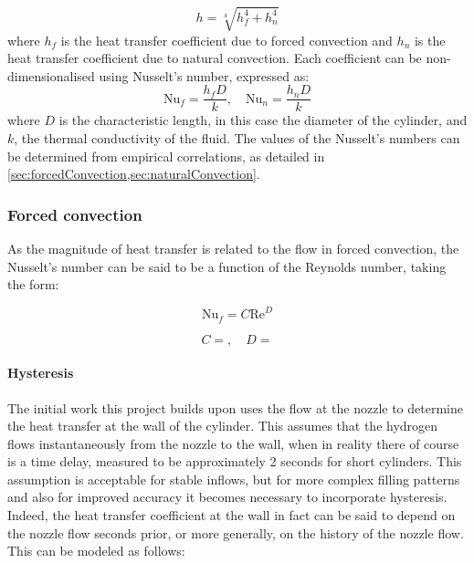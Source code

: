 \begin{equation}
h = \sqrt[4]{h_f^4 + h_n^4} 
\end{equation}
where $h_f$ is the heat transfer coefficient due to forced convection and $h_n$ is the heat transfer coefficient due to natural convection. Each coefficient can be non-dimensionalised using Nusselt's number, expressed as:
\begin{equation}
\text{Nu}_f = \frac{h_f D}{k}, \quad \text{Nu}_n = \frac{h_n D}{k}
\end{equation}
where $D$ is the characteristic length, in this case the diameter of the cylinder, and $k$, the thermal conductivity of the fluid. The values of the Nusselt's numbers can be determined from empirical correlations, as detailed in \cref{sec:forcedConvection,sec:naturalConvection}.

\subsubsection{Forced convection}
\label{sec:forcedConvection}
As the magnitude of heat transfer is related to the flow in forced convection, the Nusselt's number can be said to be a function of the Reynolds number, taking the form:

\begin{equation}
\label{equ:nusseltReynolds}
\text{Nu}_f = C \text{Re} ^D
\end{equation}


\begin{equation}
C =   ,  \quad D = 
\end{equation}


\paragraph{Hysteresis}

The initial work this project builds upon uses the flow at the nozzle to determine the heat transfer at the wall of the cylinder. This assumes that the hydrogen flows instantaneously from the nozzle to the wall, when in reality there of course is a time delay, measured to be approximately 2 seconds for short cylinders. This assumption is acceptable for stable inflows, but for more complex filling patterns and also for improved accuracy it becomes necessary to incorporate hysteresis. Indeed, the heat transfer coefficient at the wall in fact can be said to depend on the nozzle flow seconds prior, or more generally, on the history of the nozzle flow. This can be modeled as follows:

